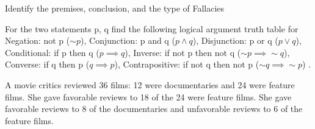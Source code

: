 \documentclass[11pt]{exam}
\begin{document}
\begin{questions}

\addpoints
\question[12] Identify the premises, conclusion, and the type of Fallacies 


\vspace{5cm}
\addpoints
\question[20] For the two statements p, q find the following logical argument truth table for Negation:  not p ($\sim{p}$), Conjunction: p and q ($p\land q$), Disjunction: p or q ($p\lor q$), Conditional: if p then q ($p\implies q$), Inverse: if not p then not q ($\sim{p}\implies \sim q$), Converse: if q then p ($q\implies p$), Contrapositive: if not q then not p ($\sim{q}\implies \sim p$) .



 
\newpage
\addpoints
\question[15] A movie critics reviewed 36 films: 12 were documentaries and 24 were feature films. She gave favorable reviews to 18 of the 24 were feature films. She gave favorable reviews to 8 of the documentaries and unfavorable reviews to 6 of the feature films.
\end{questions}
\end{document}
